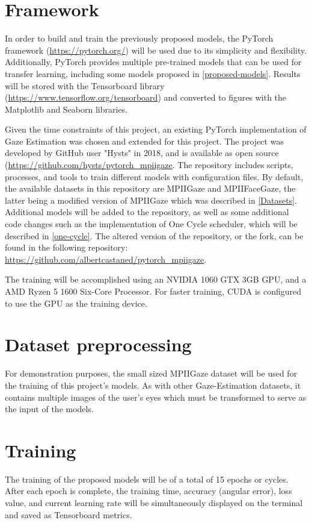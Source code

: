 \section{Framework}
In order to build and train the previously proposed models, the PyTorch framework (\url{https://pytorch.org/}) will be used due to its simplicity and flexibility. Additionally, PyTorch 
provides multiple pre-trained models that can be used for transfer learning, including some models proposed in \autoref{proposed-models}. Results will be stored with the Tensorboard
library (\url{https://www.tensorflow.org/tensorboard}) and converted to figures with the Matplotlib and Seaborn libraries.

Given the time constraints of this project, an existing PyTorch implementation of Gaze Estimation was chosen and extended for this project. The project was developed by GitHub user
"Hysts" in 2018, and is available as open source (\url{https://github.com/hysts/pytorch_mpiigaze}. The repository includes scripts, processes, and tools to train different models  
with configuration files. By default, the available datasets in this repository are MPIIGaze and MPIIFaceGaze, the latter being a modified version of MPIIGaze which was described in 
\autoref{Datasets}. Additional models will be added to the repository, as well as some additional code changes such as the implementation of One Cycle scheduler, which will be described in 
\autoref{one-cycle}. The altered version of the repository, or the fork, can be found in the following repository: \url{https://github.com/albertcastaned/pytorch_mpiigaze}. 

The training will be accomplished using an NVIDIA 1060 GTX 3GB GPU, and a AMD Ryzen 5 1600 Six-Core Processor. For faster training, CUDA is configured to use the GPU as the training device.

\section{Dataset preprocessing}
For demonstration purposes, the small sized MPIIGaze dataset will be used for the training of this project's models. As with other Gaze-Estimation datasets, it contains multiple images of the user's
eyes which must be transformed to serve as the input of the models.

\section{Training}
The training of the proposed models will be of a total of 15 epochs or cycles. After each epoch is complete, the training time, accuracy (angular error), loss value, and  
current learning rate will be simultaneously displayed on the terminal and saved as Tensorboard metrics. 

